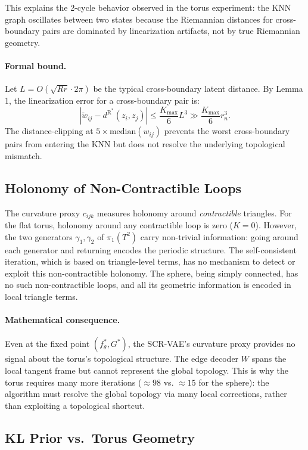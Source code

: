 \documentclass[11pt]{article}
\newcommand{\dR}{d^{\mathrm{R}}}
\newcommand{\Kmax}{K_{\max}}
\begin{document}
This explains the 2-cycle behavior observed in the torus experiment: the KNN
graph oscillates between two states because the Riemannian distances for
cross-boundary pairs are dominated by linearization artifacts, not by true
Riemannian geometry.

\paragraph{Formal bound.}
Let $L = O(\sqrt{Rr} \cdot 2\pi)$ be the typical cross-boundary latent distance.
By Lemma 1, the linearization error for a cross-boundary pair is:
\[
    |\tilde{w}_{ij} - \dR^*(z_i,z_j)| \le \frac{\Kmax}{6} L^3 \gg \frac{\Kmax}{6} r_n^3.
\]
The distance-clipping at $5 \times \mathrm{median}(w_{ij})$ prevents the worst
cross-boundary pairs from entering the KNN but does not resolve the underlying
topological mismatch.

\subsection{Holonomy of Non-Contractible Loops}

The curvature proxy $c_{ijk}$ measures holonomy around \emph{contractible}
triangles. For the flat torus, holonomy around any contractible loop is zero
($K = 0$). However, the two generators $\gamma_1, \gamma_2$ of $\pi_1(T^2)$
carry non-trivial information: going around each generator and returning encodes
the periodic structure. The self-consistent iteration, which is based on
triangle-level terms, has no mechanism to detect or exploit this non-contractible
holonomy. The sphere, being simply connected, has no such non-contractible loops,
and all its geometric information is encoded in local triangle terms.

\paragraph{Mathematical consequence.}
Even at the fixed point $(f_\theta^*, G^*)$, the SCR-VAE's curvature proxy
provides no signal about the torus's topological structure. The edge decoder $W$
spans the local tangent frame but cannot represent the global topology. This is
why the torus requires many more iterations ($\approx 98$ vs. $\approx 15$
for the sphere): the algorithm must resolve the global topology via many local
corrections, rather than exploiting a topological shortcut.

\subsection{KL Prior vs.\ Torus Geometry}
\end{document}
